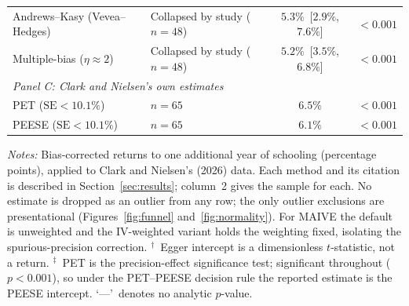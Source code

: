 \begin{table}[htbp]
\begin{tabular}{llcc}
  Andrews--Kasy (Vevea--Hedges) & Collapsed by study ($n=48$) & $5.3\%$~[$2.9\%$, $7.6\%$] & $<0.001$ \\
  Multiple-bias ($\eta\approx2$) & Collapsed by study ($n=48$) & $5.2\%$~[$3.5\%$, $6.8\%$] & $<0.001$ \\
\midrule
\multicolumn{4}{l}{\textit{Panel C: Clark and Nielsen's own estimates}} \\
  PET ($\mathrm{SE}<10.1\%$)            & $n=65$ & $6.5\%$ & $<0.001$ \\
  PEESE ($\mathrm{SE}<10.1\%$)          & $n=65$ & $6.1\%$ & $<0.001$ \\
\bottomrule
\end{tabular}

\vspace{0.5em}
\begin{minipage}{0.95\linewidth}
\footnotesize \textit{Notes:} Bias-corrected returns to one additional year of schooling (percentage points), applied to Clark and Nielsen's (2026) data. Each method and its citation is described in Section~\ref{sec:results}; column~2 gives the sample for each. No estimate is dropped as an outlier from any row; the only outlier exclusions are presentational (Figures~\ref{fig:funnel} and~\ref{fig:normality}). For MAIVE the default is unweighted and the IV-weighted variant holds the weighting fixed, isolating the spurious-precision correction. $^{\dag}$~Egger intercept is a dimensionless $t$-statistic, not a return. $^{\ddag}$~PET is the precision-effect significance test; significant throughout ($p<0.001$), so under the PET--PEESE decision rule the reported estimate is the PEESE intercept. `---'~denotes no analytic $p$-value.
\end{minipage}
\end{table}
